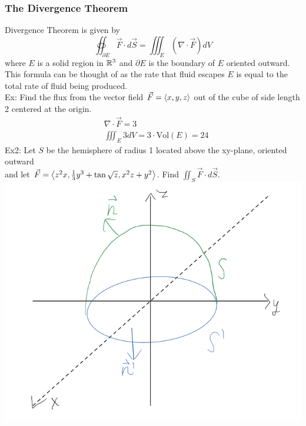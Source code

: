 \documentclass[11pt, fleqn]{article}
\begin{document}
\subsubsection{The Divergence Theorem}
Divergence Theorem is given by
$$\oiint_{\partial E}\vec{F}\cdot d\vec{S}=\iiint_E(\nabla\cdot \vec{F})dV$$
where $E$ is a solid region in $\mathbb{R}^3$ and $\partial E$ is the boundary of $E$ oriented outward.\\
This formula can be thought of as the rate that fluid escapes $E$ is equal to the total rate of fluid being produced.\\
Ex: Find the flux from the vector field $\vec{F}=\left\langle x,y,z \right\rangle$ out of the cube of side length 2 centered at the origin.
\begin{align*}
    &\nabla\cdot \vec{F}=3\\
    &\iiint_E 3dV=3\cdot\text{Vol}(E)=24
\end{align*}
Ex2: Let $S$ be the hemisphere of radius 1 located above the xy-plane, oriented outward\\
and let $\vec{F}=\left\langle z^2x,\frac{1}{3}y^3+\tan\sqrt{z},x^2z+y^2 \right\rangle$. Find $\iint_S\vec{F}\cdot d\vec{S}$.\\
\includegraphics[scale=0.5]{Math217Pictures/divergenceThmEx.png}
\end{document}
